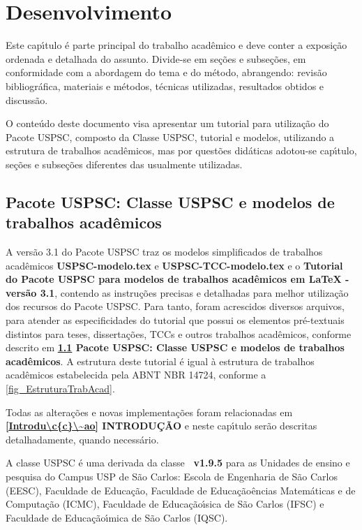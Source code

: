 

\chapter{Desenvolvimento}\label{cap_exemplos}
Este cap\'{\i}tulo \'e parte principal do trabalho acad\^emico e deve conter a exposi\c{c}\~ao ordenada e detalhada do assunto. Divide-se em se\c{c}\~oes e subse\c{c}\~oes, em conformidade com a abordagem do tema e do m\'etodo, abrangendo: revis\~ao bibliogr\'afica, materiais e m\'etodos, t\'ecnicas utilizadas, resultados obtidos e discuss\~ao.

O conte\'udo deste documento visa apresentar um tutorial para utiliza\c{c}\~ao do Pacote USPSC, composto da Classe USPSC, tutorial e modelos, utilizando a estrutura de trabalhos acad\^emicos, mas por quest\~oes did\'aticas adotou-se cap\'{\i}tulo, se\c{c}\~oes e subse\c{c}\~oes diferentes das usualmente utilizadas.


\section{Pacote USPSC: Classe USPSC e modelos de trabalhos acad\^emicos}\label{Pacote}
A vers\~ao 3.1 do Pacote USPSC traz os modelos simplificados de trabalhos acad\^emicos \textbf{USPSC-modelo.tex} e \textbf{USPSC-TCC-modelo.tex} e o \textbf{Tutorial do Pacote USPSC para modelos de trabalhos acad\^emicos em LaTeX - vers\~ao 3.1}, contendo as instru\c{c}\~oes precisas e detalhadas para melhor utiliza\c{c}\~ao dos recursos do Pacote USPSC. Para tanto, foram acrescidos diversos arquivos, para atender as especificidades do tutorial que possui os elementos pr\'e-textuais distintos para teses, disserta\c{c}\~oes, TCCs e outros trabalhos acad\^emicos, conforme descrito em  \textbf{\ref{Pacote} Pacote USPSC: Classe USPSC e modelos de trabalhos acad\^emicos}. A estrutura deste tutorial \'e igual \`a estrutura de trabalhos acad\^emicos estabelecida pela ABNT NBR 14724, conforme a \autoref{fig_EstruturaTrabAcad}.

Todas as altera\c{c}\~oes e novas implementa\c{c}\~oes foram relacionadas em \textbf{\ref{Introdu\c{c}\~ao} INTRODU\c{C}\~AO} e neste cap\'{\i}tulo ser\~ao descritas detalhadamente, quando necess\'ario. 

A classe USPSC \'e uma derivada da classe \textbf{\abnTeX\ v1.9.5} para as Unidades de ensino e pesquisa do Campus USP de S\~ao Carlos:
Escola de Engenharia de S\~ao Carlos (EESC), Faculdade de Educa\c{c}\~ao, Faculdade de Educa\c{c}\~ao\^encias Matem\'aticas e de Computa\c{c}\~ao (ICMC), Faculdade de Educa\c{c}\~ao\'{\i}sica de S\~ao Carlos (IFSC) e Faculdade de Educa\c{c}\~ao\'{\i}mica de S\~ao Carlos (IQSC).


